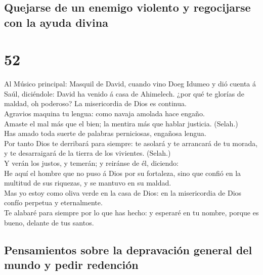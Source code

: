 \hypertarget{quejarse-de-un-enemigo-violento-y-regocijarse-con-la-ayuda-divina}{%
\subsection{Quejarse de un enemigo violento y regocijarse con la ayuda
divina}\label{quejarse-de-un-enemigo-violento-y-regocijarse-con-la-ayuda-divina}}

\hypertarget{section-51}{%
\section{52}\label{section-51}}

 Al Músico principal: Masquil de David, cuando vino Doeg
Idumeo y dió cuenta á Saúl, diciéndole: David ha venido á casa de
Ahimelech. ¿por qué te glorías de maldad, oh poderoso? La misericordia
de Dios es continua.\\
 Agravios maquina tu lengua: como navaja amolada hace
engaño.\\
 Amaste el mal más que el bien; la mentira más que hablar
justicia. (Selah.)\\
 Has amado toda suerte de palabras perniciosas, engañosa
lengua.\\
 Por tanto Dios te derribará para siempre: te asolará y te
arrancará de tu morada, y te desarraigará de la tierra de los vivientes.
(Selah.)\\
 Y verán los justos, y temerán; y reiránse de él,
diciendo:\\
 He aquí el hombre que no puso á Dios por su fortaleza,
sino que confió en la multitud de sus riquezas, y se mantuvo en su
maldad.\\
 Mas yo estoy como oliva verde en la casa de Dios: en la
misericordia de Dios confío perpetua y eternalmente.\\
 Te alabaré para siempre por lo que has hecho: y esperaré
en tu nombre, porque es bueno, delante de tus santos.

\hypertarget{pensamientos-sobre-la-depravaciuxf3n-general-del-mundo-y-pedir-redenciuxf3n-1}{%
\subsection{Pensamientos sobre la depravación general del mundo y pedir
redención}\label{pensamientos-sobre-la-depravaciuxf3n-general-del-mundo-y-pedir-redenciuxf3n-1}}

